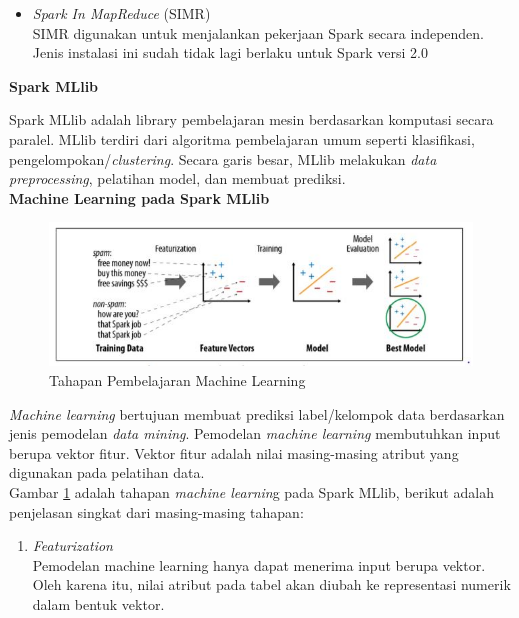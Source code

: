\documentclass[a4paper,twoside]{article}
\begin{document}
\begin{enumerate}
\begin{itemize}
\item \textit{Spark In MapReduce} (SIMR)\\ 
SIMR digunakan untuk menjalankan pekerjaan Spark secara independen. Jenis instalasi ini sudah tidak lagi berlaku untuk Spark versi 2.0
\end{itemize}

\newpage
\textbf{Spark MLlib}

Spark MLlib adalah library pembelajaran mesin berdasarkan komputasi secara paralel. MLlib terdiri dari algoritma pembelajaran umum seperti klasifikasi, pengelompokan/\textit{clustering}. Secara garis besar, MLlib melakukan \textit{data preprocessing}, pelatihan model, dan membuat prediksi.\\

\textbf{Machine Learning pada Spark MLlib}

\begin{figure}[H]
	\centering
	\includegraphics[scale=1]{machinelearningmllib}
	\caption{Tahapan Pembelajaran Machine Learning}
	\label{fig:machinelearningmllib}
\end{figure}
\textit{Machine learning} bertujuan membuat prediksi label/kelompok data berdasarkan jenis pemodelan \textit{data mining}. Pemodelan \textit{machine learning} membutuhkan input berupa vektor fitur. Vektor fitur adalah nilai masing-masing atribut yang digunakan pada pelatihan data. \\

\noindent Gambar \ref{fig:machinelearningmllib} adalah tahapan \textit{machine learnin}g pada Spark MLlib, berikut adalah penjelasan singkat dari masing-masing tahapan:

\begin{enumerate}

\item \textit{Featurization}\\
Pemodelan machine learning hanya dapat menerima input berupa vektor. Oleh karena itu, nilai atribut pada tabel akan diubah ke representasi numerik dalam bentuk vektor. 
 

\end{enumerate}
\end{enumerate}
\end{document}
